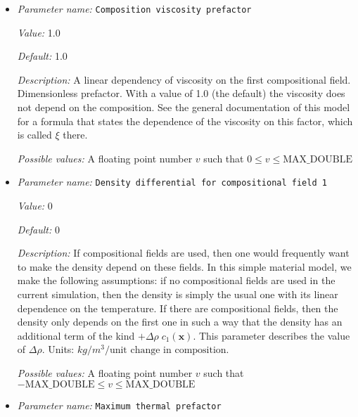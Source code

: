 \begin{itemize}
\item {\it Parameter name:} {\tt Composition viscosity prefactor}
\label{parameters:Material model/Simple model/Composition viscosity prefactor}
\label{parameters:Material_20model/Simple_20model/Composition_20viscosity_20prefactor}


{\it Value:} 1.0


{\it Default:} 1.0


{\it Description:} A linear dependency of viscosity on the first compositional field. Dimensionless prefactor. With a value of 1.0 (the default) the viscosity does not depend on the composition. See the general documentation of this model for a formula that states the dependence of the viscosity on this factor, which is called $\xi$ there.


{\it Possible values:} A floating point number $v$ such that $0 \leq v \leq \text{MAX\_DOUBLE}$
\item {\it Parameter name:} {\tt Density differential for compositional field 1}
\label{parameters:Material model/Simple model/Density differential for compositional field 1}
\label{parameters:Material_20model/Simple_20model/Density_20differential_20for_20compositional_20field_201}


{\it Value:} 0


{\it Default:} 0


{\it Description:} If compositional fields are used, then one would frequently want to make the density depend on these fields. In this simple material model, we make the following assumptions: if no compositional fields are used in the current simulation, then the density is simply the usual one with its linear dependence on the temperature. If there are compositional fields, then the density only depends on the first one in such a way that the density has an additional term of the kind $+\Delta \rho \; c_1(\mathbf x)$. This parameter describes the value of $\Delta \rho$. Units: $kg/m^3/\textrm{unit change in composition}$.


{\it Possible values:} A floating point number $v$ such that $-\text{MAX\_DOUBLE} \leq v \leq \text{MAX\_DOUBLE}$
\item {\it Parameter name:} {\tt Maximum thermal prefactor}
\label{parameters:Material model/Simple model/Maximum thermal prefactor}
\label{parameters:Material_20model/Simple_20model/Maximum_20thermal_20prefactor}



\end{itemize}

